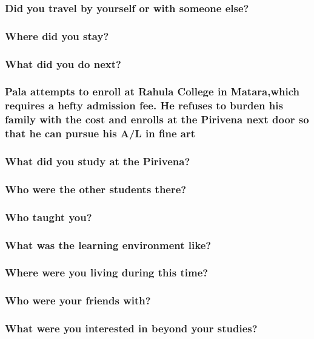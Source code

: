 \documentclass[11pt]{article}
\begin{document}
\subsubsection{Did you travel by yourself or with someone else?}
\label{sec:org175edd6}
\subsubsection{Where did you stay?}
\label{sec:orgbe269f9}
\subsubsection{What did you do next?}
\label{sec:org4912c4b}
\subsubsection{Pala attempts to enroll at Rahula College in Matara,which requires a hefty admission fee. He refuses to burden his family with the cost and enrolls at the Pirivena next door so that he can pursue his A/L in fine art}
\label{sec:orgee9e324}

\subsubsection{What did you study at the Pirivena?}
\label{sec:org30e59fd}
\subsubsection{Who were the other students there?}
\label{sec:orgaa29ed7}
\subsubsection{Who taught you?}
\label{sec:org205753b}
\subsubsection{What was the learning environment like?}
\label{sec:org21b2685}
\subsubsection{Where were you living during this time?}
\label{sec:org989f02a}
\subsubsection{Who were your friends with?}
\label{sec:org1e46372}
\subsubsection{What were you interested in beyond your studies?}
\label{sec:org1f4b296}
\end{document}
